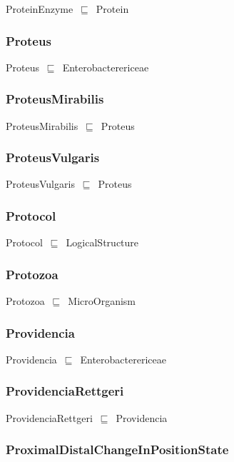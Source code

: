 \documentclass{article}
\begin{document}
ProteinEnzyme~\ensuremath{\sqsubseteq}~Protein~

\subsubsection*{Proteus}

Proteus~\ensuremath{\sqsubseteq}~Enterobacterericeae~

\subsubsection*{ProteusMirabilis}

ProteusMirabilis~\ensuremath{\sqsubseteq}~Proteus~

\subsubsection*{ProteusVulgaris}

ProteusVulgaris~\ensuremath{\sqsubseteq}~Proteus~

\subsubsection*{Protocol}

Protocol~\ensuremath{\sqsubseteq}~LogicalStructure~

\subsubsection*{Protozoa}

Protozoa~\ensuremath{\sqsubseteq}~MicroOrganism~

\subsubsection*{Providencia}

Providencia~\ensuremath{\sqsubseteq}~Enterobacterericeae~

\subsubsection*{ProvidenciaRettgeri}

ProvidenciaRettgeri~\ensuremath{\sqsubseteq}~Providencia~

\subsubsection*{ProximalDistalChangeInPositionState}
\end{document}
